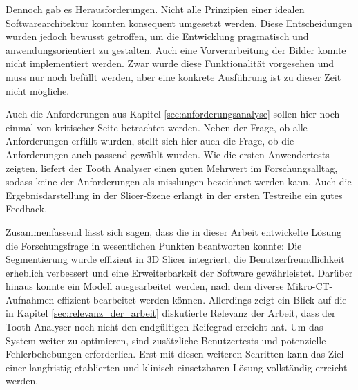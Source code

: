 Dennoch gab es Herausforderungen. Nicht alle Prinzipien einer idealen Softwarearchitektur
konnten konsequent umgesetzt werden. Diese Entscheidungen wurden jedoch bewusst
getroffen, um die Entwicklung pragmatisch und anwendungsorientiert zu gestalten.
Auch eine Vorverarbeitung der Bilder konnte nicht implementiert werden. Zwar wurde
diese Funktionalität vorgesehen und muss nur noch befüllt werden, aber eine
konkrete Ausführung ist zu dieser Zeit nicht mögliche.

Auch die Anforderungen aus Kapitel \ref{sec:anforderungsanalyse} sollen hier
noch einmal von kritischer Seite betrachtet werden. Neben der Frage, ob alle
Anforderungen erfüllt wurden, stellt sich hier auch die Frage, ob die
Anforderungen auch passend gewählt wurden. Wie die ersten Anwendertests zeigten,
liefert der Tooth Analyser einen guten Mehrwert im Forschungsalltag, sodass keine
der Anforderungen als misslungen bezeichnet werden kann. Auch die
Ergebnisdarstellung in der Slicer-Szene erlangt in der ersten Testreihe ein
gutes Feedback.

Zusammenfassend lässt sich sagen, dass die in dieser Arbeit entwickelte Lösung die
Forschungsfrage in wesentlichen Punkten beantworten konnte: Die Segmentierung
wurde effizient in 3D Slicer integriert, die Benutzerfreundlichkeit erheblich verbessert
und eine Erweiterbarkeit der Software gewährleistet. Darüber hinaus konnte ein
Modell ausgearbeitet werden, nach dem diverse Mikro-CT-Aufnahmen effizient bearbeitet
werden können. Allerdings zeigt ein Blick auf die in Kapitel
\ref{sec:relevanz_der_arbeit} diskutierte Relevanz der Arbeit, dass der Tooth Analyser
noch nicht den endgültigen Reifegrad erreicht hat. Um das System weiter zu
optimieren, sind zusätzliche Benutzertests und potenzielle Fehlerbehebungen erforderlich.
Erst mit diesen weiteren Schritten kann das Ziel einer langfristig etablierten
und klinisch einsetzbaren Lösung vollständig erreicht werden.
